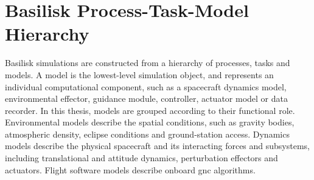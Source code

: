 \section{Basilisk Process-Task-Model Hierarchy}

Basilisk simulations are constructed from a hierarchy of processes, tasks and models. A model is the lowest-level simulation object, and represents an individual computational component, such as a spacecraft dynamics model, environmental effector, guidance module, controller, actuator model or data recorder. In this thesis, models are grouped according to their functional role. Environmental models describe the spatial conditions, such as gravity bodies, atmospheric density, eclipse conditions and ground-station access. Dynamics models describe the physical spacecraft and its interacting forces and subsystems, including translational and attitude dynamics, perturbation effectors and actuators. Flight software models describe onboard \gls{gnc} algorithms.


